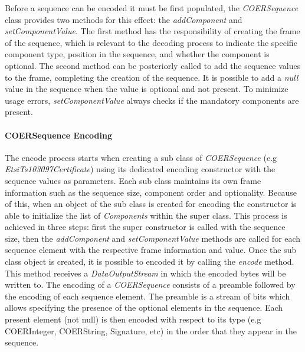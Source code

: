 Before a sequence can be encoded it must be first populated, the \textit{COERSequence} class provides two methods for this effect: the \textit{addComponent} and \textit{setComponentValue}. The first method has the responsibility of creating the frame of the sequence, which is relevant to the decoding process to indicate the specific component type, position in the sequence, and whether the component is optional. The second method can be posteriorly called to add the sequence values to the frame, completing the creation of the sequence. It is possible to add a \textit{null} value in the sequence when the value is optional and not present. To minimize usage errors, \textit{setComponentValue} always checks if the mandatory components are present.



\paragraph{COERSequence Encoding}
The encode process starts when creating a sub class of \textit{COERSequence} (e.g \textit{EtsiTs103097Certificate}) using its dedicated encoding constructor with the sequence values as parameters. Each sub class maintains its own frame information such as the sequence size, component order and optionality. Because of this, when an object of the sub class is created for encoding the constructor is able to initialize the list of \textit{Components} within the super class. This process is achieved in three steps: first the super constructor is called with the sequence size, then the \textit{addComponent} and \textit{setComponentValue} methods are called for each sequence element with the respective frame information and value. Once the sub class object is created, it is possible to encoded it by calling the \textit{encode} method. This method receives a \textit{DataOutputStream} in which the encoded bytes will be written to. The encoding of a \textit{COERSequence} consists of a preamble followed by the encoding of each sequence element. The preamble is a stream of bits which allows specifying the presence of the optional elements in the sequence. Each present element (not null) is then encoded with respect to its type (e.g COERInteger, COERString, Signature, etc) in the order that they appear in the sequence. 

